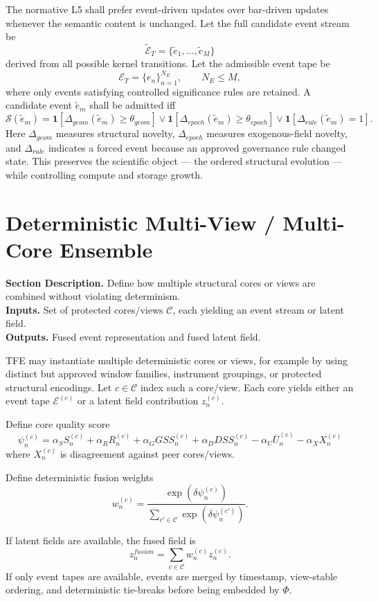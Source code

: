 \documentclass[11pt]{report}
\newcommand{\E}{\mathcal{E}}
\newcommand{\meta}[3]{\textbf{Section Description.} #1\\
\textbf{Inputs.} #2\\
\textbf{Outputs.} #3\par}
\begin{document}
The normative L5 shall prefer event-driven updates over bar-driven updates whenever the semantic content is unchanged. Let the full candidate event stream be
\[
\widetilde{\mathcal{E}}_T = \{\tilde e_1,\dots,\tilde e_M\}
\]
derived from all possible kernel transitions. Let the admissible event tape be
\[
\mathcal{E}_T = \{e_n\}_{n=1}^{N_E},\qquad N_E\le M,
\]
where only events satisfying controlled significance rules are retained. A candidate event $\tilde e_m$ shall be admitted iff
\[
\mathcal{S}(\tilde e_m)=\mathbf{1}[\Delta_{geom}(\tilde e_m)\ge \theta_{geom}]\vee \mathbf{1}[\Delta_{epoch}(\tilde e_m)\ge \theta_{epoch}]\vee \mathbf{1}[\Delta_{rule}(\tilde e_m)=1].
\]
Here $\Delta_{geom}$ measures structural novelty, $\Delta_{epoch}$ measures exogenous-field novelty, and $\Delta_{rule}$ indicates a forced event because an approved governance rule changed state. This preserves the scientific object --- the ordered structural evolution --- while controlling compute and storage growth.

\section{Deterministic Multi-View / Multi-Core Ensemble}
\meta{Define how multiple structural cores or views are combined without violating determinism.}{Set of protected cores/views $\mathcal{C}$, each yielding an event stream or latent field.}{Fused event representation and fused latent field.}

TFE may instantiate multiple deterministic cores or views, for example by using distinct but approved window families, instrument groupings, or protected structural encodings. Let $c\in\mathcal{C}$ index such a core/view. Each core yields either an event tape $\E^{(c)}$ or a latent field contribution $z_n^{(c)}$.

Define core quality score
\[
\psi_n^{(c)} = \alpha_S S_n^{(c)} + \alpha_R R_n^{(c)} + \alpha_G GSS_n^{(c)} + \alpha_D DSS_n^{(c)} - \alpha_U \bar U_n^{(c)} - \alpha_X X_n^{(c)}
\]
where $X_n^{(c)}$ is disagreement against peer cores/views.

Define deterministic fusion weights
\[
w_n^{(c)} = \frac{\exp(\delta\psi_n^{(c)})}{\sum_{c'\in\mathcal{C}}\exp(\delta\psi_n^{(c')})}.
\]

If latent fields are available, the fused field is
\[
z_n^{fusion}=\sum_{c\in\mathcal{C}} w_n^{(c)} z_n^{(c)}.
\]
If only event tapes are available, events are merged by timestamp, view-stable ordering, and deterministic tie-breaks before being embedded by $\Phi$.
\end{document}
